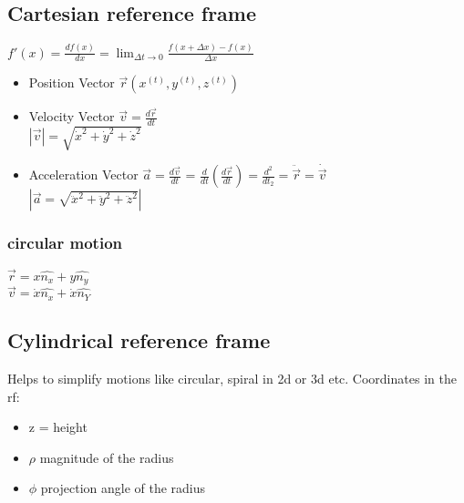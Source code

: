 \documentclass{article}
\begin{document}
\subsection{Cartesian reference frame}
$f'(x) = \frac{df(x)}{dx} = \lim_{\Delta t\to 0} \frac{f(x + \Delta x)  - f(x)}{\Delta x}$
\begin{itemize}
	\item Position Vector $\vec{r}(x^{(t)}, y^{(t)}, z^{(t)})$
	\item Velocity Vector $\vec{v} = \frac{d\vec{r}}{dt}$ \\
	$|\vec{v}| = \sqrt{\dot{x}^2 + \dot{y}^2 + \dot{z}^2}$
	\item Acceleration Vector $\vec{a} = \frac{d\vec{v}}{dt}$ = $\frac{d}{dt}(\frac{d\vec{r}}{dt}) = \frac{d^2}{dt_2} = \ddot{\vec{r}} = \dot{\vec{v}}$ \\
	$|\vec{a} = \sqrt{\ddot{x}^2 + \ddot{y}^2 + \ddot{z}^2}|$
\end{itemize}
\subsubsection{circular motion}
$\vec{r} = x \hat{n_x} + y \hat{n_y}$ \\
$\vec{v} = \dot{x} \hat{n_x} + \dot{x} \hat{n_Y} $
\subsection{Cylindrical reference frame}
Helps to simplify motions like circular, spiral in 2d or 3d etc.
Coordinates in the rf:
\begin{itemize}
	\item z = height
	\item $\rho$ magnitude of the radius
	\item $\phi$ projection angle of the radius
\end{itemize}
\end{document}
